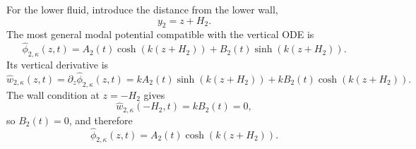 \documentclass[11pt,a4paper]{article}
\begin{document}
For the lower fluid, introduce the distance from the lower wall,
\begin{equation}
    y_2=z+H_2.
\end{equation}
The most general modal potential compatible with the vertical ODE is
\begin{equation}
    \widehat{\phi}_{2,\kappa}(z,t)
    =
    A_2(t)\cosh(k(z+H_2))
    +
    B_2(t)\sinh(k(z+H_2)).
    \label{eq:lower_general_potential}
\end{equation}
Its vertical derivative is
\begin{equation}
    \widehat{w}_{2,\kappa}(z,t)
    =
    \partial_z\widehat{\phi}_{2,\kappa}(z,t)
    =
    kA_2(t)\sinh(k(z+H_2))
    +
    kB_2(t)\cosh(k(z+H_2)).
\end{equation}
The wall condition at $z=-H_2$ gives
\begin{equation}
    \widehat{w}_{2,\kappa}(-H_2,t)
    =
    kB_2(t)
    =
    0,
\end{equation}
so $B_2(t)=0$, and therefore
\begin{equation}
    \widehat{\phi}_{2,\kappa}(z,t)
    =
    A_2(t)\cosh(k(z+H_2)).
\end{equation}
\end{document}
